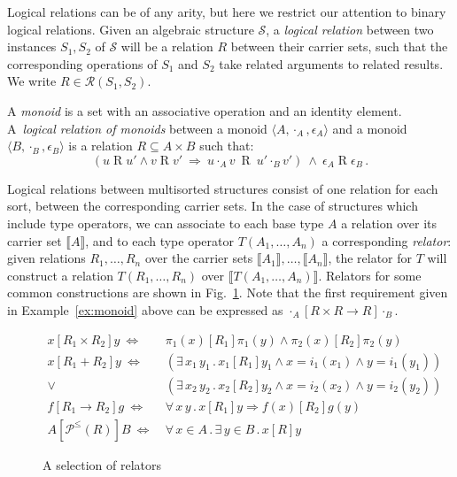 \documentclass[sigplan,10pt,review,anonymous]{acmart}\settopmatter{printfolios=true,printccs=false,printacmref=false}
\newcommand{\ifr}[1]{\mathrel{[{#1}]}}
\begin{document}
Logical relations can be of any arity,
but here
we restrict our attention to
binary logical relations.
Given an algebraic structure $\mathcal{S}$,
a \emph{logical relation}
between two instances $S_1, S_2$ of $\mathcal{S}$
will be a relation $R$
between their carrier sets,
such that the corresponding operations of $S_1$ and $S_2$
take related arguments to related results.
We write $R \in \mathcal{R}(S_1, S_2)$.

\begin{example}
\label{ex:monoid}
A \emph{monoid} is a set with
an associative operation and
an identity element.
A~\emph{logical relation of monoids} between
a monoid $\langle A, \cdot_A, \epsilon_A \rangle$ and
a monoid $\langle B, \cdot_B, \epsilon_B \rangle$
is a relation $R \subseteq A \times B$
such that:
\[
(u \mathrel{R} u' \wedge v \mathrel{R} v' \: \Rightarrow \:
 u \cdot_A v \: \mathrel{R} \: u' \cdot_B v')
\: \wedge \:
\epsilon_A \mathrel{R} \epsilon_B \,.
\]
\end{example}

Logical relations between multisorted structures
consist of one relation for each sort,
between the corresponding carrier sets.
In the case of structures which include type operators,
we can associate to each base type $A$
a relation over its carrier set $\llbracket A \rrbracket$,
and to each type operator $T(A_1, \ldots, A_n)$
a corresponding \emph{relator}:
given relations $R_1, \ldots, R_n$ over
the carrier sets $\llbracket A_1 \rrbracket, \ldots, \llbracket A_n \rrbracket$,
the relator for $T$
will construct a relation $T(R_1, \ldots, R_n)$
over $\llbracket T(A_1, \ldots, A_n) \rrbracket$.
Relators for some common constructions are shown in Fig.~\ref{fig:relators}.
Note that the first requirement given in Example~\ref{ex:monoid} above
can be expressed as
$
  \cdot_A \ifr{R \times R \rightarrow R} \cdot_B
$.

\begin{figure} %
  {\small
  \begin{align*}
    x \ifr{R_1 \times R_2} y \ \Leftrightarrow\  &
      \pi_1(x) \ifr{R_1} \pi_1(y) \wedge
      \pi_2(x) \ifr{R_2} \pi_2(y) \\
    x \ifr{R_1 + R_2} y \ \Leftrightarrow\  &
      (\exists \, x_1 \, y_1 \,.\,
        x_1 \ifr{R_1} y_1 \wedge
        x = i_1(x_1) \wedge
        y = i_1(y_1)) \\ \vee\ &
      (\exists \, x_2 \, y_2 \,.\,
        x_2 \ifr{R_2} y_2 \wedge
        x = i_2(x_2) \wedge
        y = i_2(y_2)) \\
    f \ifr{R_1 \rightarrow R_2} g \ \Leftrightarrow\  &
      \forall \, x \, y \,.\,
        x \ifr{R_1} y \Rightarrow
        f(x) \ifr{R_2} g(y) \\
    A \ifr{\mathcal{P}^\le(R)} B \ \Leftrightarrow\  &
      \forall \, x \in A \,.\,
      \exists \, y \in B \,.\,
      x \ifr{R} y
  \end{align*}
  }%
  \caption{A selection of relators}
  \label{fig:relators}
\end{figure}
\end{document}
